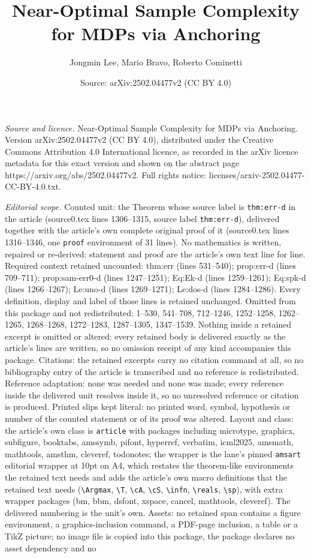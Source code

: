 \documentclass[10pt,a4paper]{amsart}
\title[Near-Optimal Sample Complexity for MDPs via Anchoring]{Near-Optimal Sample Complexity for MDPs via Anchoring}
\author{Jongmin Lee, Mario Bravo, Roberto Cominetti}
\date{Source: arXiv:2502.04477v2 (CC BY 4.0)}
\begin{document}
\maketitle

\noindent\emph{Source and licence.} Near-Optimal Sample Complexity for MDPs via Anchoring. Version arXiv:2502.04477v2 (CC BY 4.0), distributed under the Creative Commons Attribution 4.0 International licence, as recorded in the arXiv licence metadata for this exact version and shown on the abstract page https://arxiv.org/abs/2502.04477v2. Full rights notice: licenses/arxiv-2502.04477-CC-BY-4.0.txt.\par\smallskip

\noindent\textit{Editorial scope.} Counted unit: the Theorem whose source label is \texttt{thm:err-d} in the article (source0.tex lines 1306--1315, source label \texttt{thm:err-d}), delivered together with the article's own complete original proof of it (source0.tex lines 1316--1346, one \texttt{proof} environment of 31 lines). No mathematics is written, repaired or re-derived: statement and proof are the article's own text line for line. Required context retained uncounted: thm:err (lines 531--540); prop:err-d (lines 709--711); prop:sam-err0-d (lines 1247--1251); Eq:Ek-d (lines 1259--1261); Eq:spk-d (lines 1266--1267); Le:uno-d (lines 1269--1271); Le:dos-d (lines 1284--1286). Every definition, display and label of those lines is retained unchanged. Omitted from this package and not redistributed: 1--530, 541--708, 712--1246, 1252--1258, 1262--1265, 1268--1268, 1272--1283, 1287--1305, 1347--1539. Nothing inside a retained excerpt is omitted or altered: every retained body is delivered exactly as the article's lines are written, so no omission receipt of any kind accompanies this package. Citations: the retained excerpts carry no citation command at all, so no bibliography entry of the article is transcribed and no reference is redistributed. Reference adaptation: none was needed and none was made; every reference inside the delivered unit resolves inside it, so no unresolved reference or citation is produced. Printed slips kept literal: no printed word, symbol, hypothesis or number of the counted statement or of its proof was altered. Layout and class: the article's own class is \texttt{article} with packages including microtype, graphicx, subfigure, booktabs, amssymb, pifont, hyperref, verbatim, icml2025, amsmath, mathtools, amsthm, cleveref, todonotes; the wrapper is the lane's pinned \texttt{amsart} editorial wrapper at 10pt on A4, which restates the theorem-like environments the retained text needs and adds the article's own macro definitions that the retained text needs (\texttt{\textbackslash Argmax}, \texttt{\textbackslash T}, \texttt{\textbackslash cA}, \texttt{\textbackslash cS}, \texttt{\textbackslash infn}, \texttt{\textbackslash reals}, \texttt{\textbackslash sp}), with extra wrapper packages (bm, bbm, dsfont, xspace, cancel, mathtools, cleveref). The delivered numbering is the unit's own. Assets: no retained span contains a figure environment, a graphics-inclusion command, a PDF-page inclusion, a table or a TikZ picture; no image file is copied into this package, the package declares no asset dependency and no 
\end{document}
